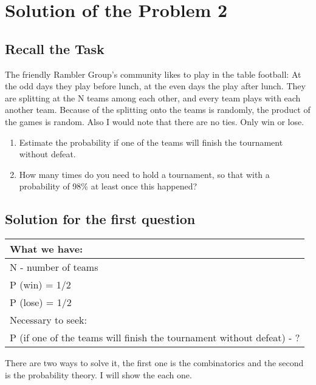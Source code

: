 \documentclass[14pt, a4paper]{extarticle}
\begin{document}
\newpage

\section*{Solution of the Problem 2}
\subsection*{Recall the Task}

The friendly Rambler Group's community likes to play in the table football: 
At the odd days they play before lunch, at the even days the play after lunch.
They are splitting at the N teams among each other, and every team plays with each another team.
Because of the splitting onto the teams is randomly, the product of the games is random.
Also I would note that there are no ties. Only win or lose.
\begin{enumerate}
	\item Estimate the probability if one of the teams will finish the tournament without defeat.
	\item How many times do you need to hold a tournament, so that with a probability of 98\% at least once this happened?
\end{enumerate} 

\subsection*{Solution for the first question}

\begin{table}[h]
    \begin{tabular}{|l|}
    \hline
    What we have:                                                         \\ \hline
    N - number of teams                                                   \\
    P (win) = 1/2                                                         \\
    P (lose) = 1/2                                                        \\ \hline
    Necessary to seek:                                                    \\ \hline
    P (if one of the teams will finish the tournament without defeat) - ? \\ \hline
    \end{tabular}
\end{table}
\noindent
There are two ways to solve it, the first one is the combinatorics and the second is the
probability theory. I will show the each one.
\end{document}
